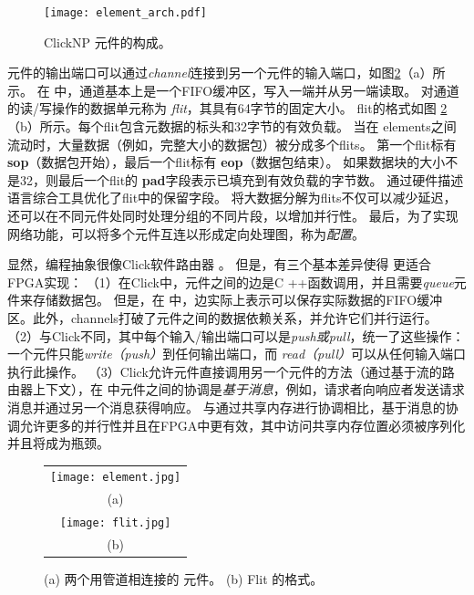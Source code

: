 \begin{figure}
\centering
\texttt{[image: element\_arch.pdf]}
\caption{ClickNP 元件的构成。}
\label{clicknp:fig:element_arch}
\end{figure}

元件的输出端口可以通过\textit {channel}连接到另一个元件的输入端口，如图\ref {clicknp:fig:element}（a）所示。
在 \name 中，通道基本上是一个FIFO缓冲区，写入一端并从另一端读取。
对通道的读/写操作的数据单元称为 \textit {flit}，其具有64字节的固定大小。
flit的格式如图 \ref {clicknp:fig:element}（b）所示。每个flit包含元数据的标头和32字节的有效负载。
当在 \name elements之间流动时，大量数据（例如，完整大小的数据包）被分成多个flits。
第一个flit标有 \textbf {sop}（数据包开始），最后一个flit标有 \textbf {eop}（数据包结束）。
如果数据块的大小不是32，则最后一个flit的 \textbf {pad}字段表示已填充到有效负载的字节数。
通过硬件描述语言综合工具优化了flit中的保留字段。
将大数据分解为flits不仅可以减少延迟，还可以在不同元件处同时处理分组的不同片段，以增加并行性。
最后，为了实现网络功能，可以将多个\name 元件互连以形成定向处理图，称为\name \textit {配置}。

显然，\name 编程抽象很像Click软件路由器 \cite {kohler2000click}。
但是，有三个基本差异使得 \name 更适合FPGA实现：
（1）在Click中，元件之间的边是C ++函数调用，并且需要\textit {queue}元件来存储数据包。
但是，在 \name 中，边实际上表示可以保存实际数据的FIFO缓冲区。此外，\name  channels打破了元件之间的数据依赖关系，并允许它们并行运行。
（2）与Click不同，其中每个输入/输出端口可以是\textit {push或pull}，\name 统一了这些操作：一个元件只能\textit {write（push）}到任何输出端口，而 \textit {read（pull）}可以从任何输入端口执行此操作。
（3）Click允许元件直接调用另一个元件的方法（通过基于流的路由器上下文），在 \name 中元件之间的协调是\textit {基于消息}，例如，请求者向响应者发送请求消息并通过另一个消息获得响应。
与通过共享内存进行协调相比，基于消息的协调允许更多的并行性并且在FPGA中更有效，其中访问共享内存位置必须被序列化并且将成为瓶颈。
\begin{figure}
\centering
\begin{tabular}{c}
\texttt{[image: element.jpg]}  \\
(a)\\
\texttt{[image: flit.jpg]} \\
(b) \\
\end{tabular}

\caption{(a) 两个用管道相连接的 \name 元件。 (b) Flit 的格式。}
\label{clicknp:fig:element}

\end{figure}

